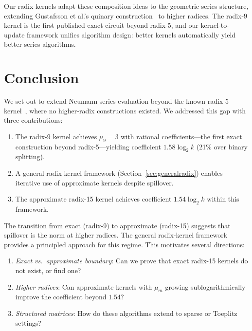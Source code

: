 \documentclass[
  journal=largetwo,
  manuscript=article,
  manuscriptlabel={Research Preprint},
  logo=false,
  simfonts=false,
  year=2026,
  volume=1,
]{cup-journal}
\theoremstyle{definition}
\theoremstyle{remark}
\begin{document}

Our radix kernels adapt these composition ideas to the geometric series structure, extending Gustafsson et al.'s quinary construction~\cite{gustafsson2017} to higher radices.
The radix-9 kernel is the first published exact circuit beyond radix-5, and our kernel-to-update framework unifies algorithm design: better kernels automatically yield better series algorithms.


\section{Conclusion}
\label{sec:conclusion}

We set out to extend Neumann series evaluation beyond the known radix-5
kernel~\cite{gustafsson2017}, where no higher-radix constructions existed.
We addressed this gap with three contributions:
\begin{enumerate}
  \item The radix-9 kernel achieves $\mu_9 = 3$ with rational
    coefficients---the first exact construction beyond radix-5---yielding
    coefficient $1.58\log_2 k$ (21\% over binary splitting).
  \item A general radix-kernel framework (Section~\ref{sec:generalradix})
    enables iterative use of approximate kernels despite spillover.
  \item The approximate radix-15 kernel achieves coefficient $1.54\log_2 k$
    within this framework.
\end{enumerate}

The transition from exact (radix-9) to approximate (radix-15) suggests
that spillover is the norm at higher radices. The general radix-kernel
framework provides a principled approach for this regime.
This motivates several directions:
\begin{enumerate}
  \item \emph{Exact vs.\ approximate boundary}: Can we prove that exact
    radix-15 kernels do not exist, or find one?
  \item \emph{Higher radices}: Can approximate kernels with $\mu_m$
    growing sublogarithmically improve the coefficient beyond $1.54$?
  \item \emph{Structured matrices}: How do these algorithms extend to
    sparse or Toeplitz settings?
\end{enumerate}
\end{document}
